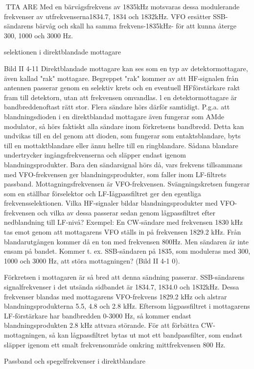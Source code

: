 TTA ARE
Med en bärvågsfrekvens av 1835kHz motsvaras dessa modulerande frekvenser av
utfrekvenserna1834.7, 1834 och 1832kHz.
VFO ersätter SSB-sändarens bärvåg och
skall ha samma frekvens-1835kHz- för att
kunna återge 300, 1000 och 3000 Hz.

selektionen i direktblandade mottagare

Bild II 4-11
Direktblandade mottagare kan ses som en
typ av detektormottagare, även kallad "rak"
mottagare. Begreppet "rak" kommer av att
HF-signalen från antennen passerar genom en selektiv krets och en eventuell HFförstärkare rakt fram till detektorn, utan att
frekvensen omvandlas.
l en detektormottagare är bandbreddenoftast rätt stor. Flera sändare hörs därför
samtidigt.
P.g.a. att blandningsdioden i en direktblandad mottagare även fungerar som AMde modulator, så hörs faktiskt alla sändare
inom förkretsens bandbredd. Detta kan undvikas till en del genom att dioden, som
fungerar som entaktsblandare, byts till en
mottaktblandare eller ännu hellre till en ringblandare. Sådana blandare undertrycker ingångsfrekvenserna och släpper endast igenom blandningsprodukter. Bara den sändarsignal hörs då, vars frekvens tillsammans med VFO-frekvensen ger blandningsprodukter, som faller inom LF-filtrets passband. Mottagningsfrekvensen är VFO-frekvensen. Svängningskretsen fungerar som
en ställbar förselektor och LF-Iågpassfiltret
ger den egentliga frekvensselektionen.
Vilka HF-signaler bildar blandningsprodukter med VFO-frekvensen och vilka av
dessa passerar sedan genom lågpassfiltret
efter nedblandning till LF-nivå?
Exempel:
En CW-sändare med frekvensen 1830 kHz
tas emot genom att mottagarens VFO ställs
in på frekvensen 1829.2 kHz. Från blandarutgången kommer då en ton med frekvensen 800Hz.
Men sändaren är inte ensam på bandet.
Kommer t. ex. SSB-sändaren på 1835, som
moduleras med 300, 1000 och 3000 Hz, att
störa mottagningen? (Bild II 4-1 0).

Förkretsen i mottagaren är så bred att
denna sändning passerar. SSB-sändarens
signalfrekvenser i det utsända sidbandet är
1834.7, 1834.0 och 1832kHz. Dessa frekvenser blandas med mottagarens VFO-frekvens 1829.2 kHz och alstrar blandningsprodukterna 5.5, 4.8 och 2.8 kHz. Eftersom
lågpassfiltret i mottagarens LF-förstärkare
har bandbredden 0-3000 Hz, så kommer
endast blandningsprodukten 2.8 kHz attvara
störande. För att förbättra CW-mottagningen, så kan lågpassfiltret bytas ut mot ett
bandpassfilter, som endast släpper igenom
ett smalt frekvensområde omkring mittfrekvensen 800 Hz.

Passband och spegelfrekvenser i direktblandare

